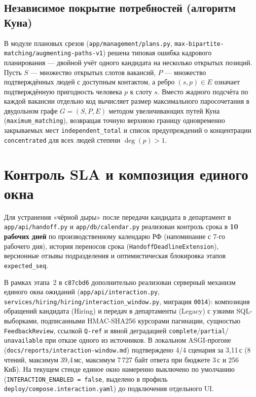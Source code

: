 \documentclass[10pt,a4paper,twocolumn]{article}
\newcommand{\code}[1]{\texttt{#1}}
\begin{document}
\subsection{Независимое покрытие потребностей (алгоритм Куна)}

В модуле плановых срезов (\code{app/management/plans.py}, \code{max-bipartite-matching/augmenting-paths-v1})
решена типовая ошибка кадрового планирования — двойной учёт одного кандидата на несколько
открытых позиций. Пусть $S$ — множество открытых слотов вакансий, $P$ — множество
подтверждённых людей с доступным контактом, а ребро $(s, p) \in E$ означает подтверждённую
пригодность человека $p$ к слоту $s$. Вместо жадного подсчёта по каждой вакансии отдельно код
вычисляет размер максимального паросочетания в двудольном графе $G = (S, P, E)$ методом
увеличивающих путей Куна (\code{maximum\_matching}), возвращая точную верхнюю границу
одновременно закрываемых мест \code{independent\_total} и список предупреждений о концентрации
\code{concentrated} для всех людей степени $\deg(p) > 1$.

\section{Контроль SLA и композиция единого окна}

Для устранения «чёрной дыры» после передачи кандидата в департамент в \code{app/api/handoff.py}
и \code{app/db/calendar.py} реализован контроль срока в \textbf{10 рабочих дней} по
производственному календарю РФ (напоминание с 7-го рабочего дня), история переносов срока
(\code{HandoffDeadlineExtension}), версионные отзывы подразделения и оптимистическая блокировка
этапов \code{expected\_seq}.

В рамках этапа~2 в \code{c87cbd6} дополнительно реализован серверный механизм единого окна
ожиданий (\code{app/api/interaction.py}, \code{services/hiring/hiring/interaction\_window.py},
миграция \code{0014}): композиция обращений кандидата (Hiring) и передач в департаменты (Legacy)
с узкими SQL-выборками, подписанными HMAC-SHA256 курсорами пагинации, сущностью
\code{FeedbackReview}, ссылкой \code{Q-ref} и явной деградацией \code{complete}/\code{partial}/
\code{unavailable} при отказе одного из источников. В локальном ASGI-прогоне
(\code{docs/reports/interaction-window.md}) подтверждено 4/4 сценария за 3,11\,с (8 чтений,
максимум 39,4\,мс, максимум 7\,727 байт ответа при бюджете 3\,с и 256\,КиБ). На текущем стенде
единое окно намеренно выключено по умолчанию (\code{INTERACTION\_ENABLED = false}, выделено в
профиль \code{deploy/compose.interaction.yaml}) до подключения отдельного UI.
\end{document}
